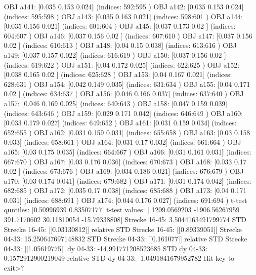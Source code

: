 OBJ a141: [0.035 0.153 0.024] (indices: 592:595 )
OBJ a142: [0.035 0.153 0.024] (indices: 595:598 )
OBJ a143: [0.035 0.163 0.021] (indices: 598:601 )
OBJ a144: [0.035 0.156 0.021] (indices: 601:604 )
OBJ a145: [0.037 0.173 0.02 ] (indices: 604:607 )
OBJ a146: [0.037 0.156 0.02 ] (indices: 607:610 )
OBJ a147: [0.037 0.156 0.02 ] (indices: 610:613 )
OBJ a148: [0.04  0.15  0.038] (indices: 613:616 )
OBJ a149: [0.037 0.157 0.022] (indices: 616:619 )
OBJ a150: [0.037 0.156 0.02 ] (indices: 619:622 )
OBJ a151: [0.04  0.172 0.025] (indices: 622:625 )
OBJ a152: [0.038 0.165 0.02 ] (indices: 625:628 )
OBJ a153: [0.04  0.167 0.021] (indices: 628:631 )
OBJ a154: [0.042 0.149 0.035] (indices: 631:634 )
OBJ a155: [0.04  0.171 0.02 ] (indices: 634:637 )
OBJ a156: [0.046 0.166 0.037] (indices: 637:640 )
OBJ a157: [0.046 0.169 0.025] (indices: 640:643 )
OBJ a158: [0.047 0.159 0.039] (indices: 643:646 )
OBJ a159: [0.029 0.171 0.042] (indices: 646:649 )
OBJ a160: [0.033 0.179 0.027] (indices: 649:652 )
OBJ a161: [0.031 0.159 0.034] (indices: 652:655 )
OBJ a162: [0.031 0.159 0.031] (indices: 655:658 )
OBJ a163: [0.03  0.158 0.033] (indices: 658:661 )
OBJ a164: [0.031 0.17  0.032] (indices: 661:664 )
OBJ a165: [0.03  0.175 0.035] (indices: 664:667 )
OBJ a166: [0.031 0.161 0.031] (indices: 667:670 )
OBJ a167: [0.03  0.176 0.036] (indices: 670:673 )
OBJ a168: [0.033 0.17  0.02 ] (indices: 673:676 )
OBJ a169: [0.034 0.186 0.021] (indices: 676:679 )
OBJ a170: [0.03  0.174 0.041] (indices: 679:682 )
OBJ a171: [0.031 0.174 0.042] (indices: 682:685 )
OBJ a172: [0.035 0.17  0.038] (indices: 685:688 )
OBJ a173: [0.04  0.171 0.031] (indices: 688:691 )
OBJ a174: [0.044 0.176 0.027] (indices: 691:694 )
t-test quntiles: [0.50996939 0.83507177]
t-test values: [ 1209.0569203  -1906.56267959   391.7170602     30.11810054
   -15.79338808]
Strecke 16-45: 3.5044163491799774
STD Strecke 16-45: [[0.03130812]]
relative STD Strecke 16-45: [[0.89339051]]%
Strecke 04-33: 15.250647697148832
STD Strecke 04-33: [[0.161077]]
relative STD Strecke 04-33: [[1.05619775]]%
dy 04-33: -14.991771208523685
STD dy 04-33: 0.1572912900219049
relative STD dy 04-33: -1.0491841679952782%
Hit key to exit>? 
